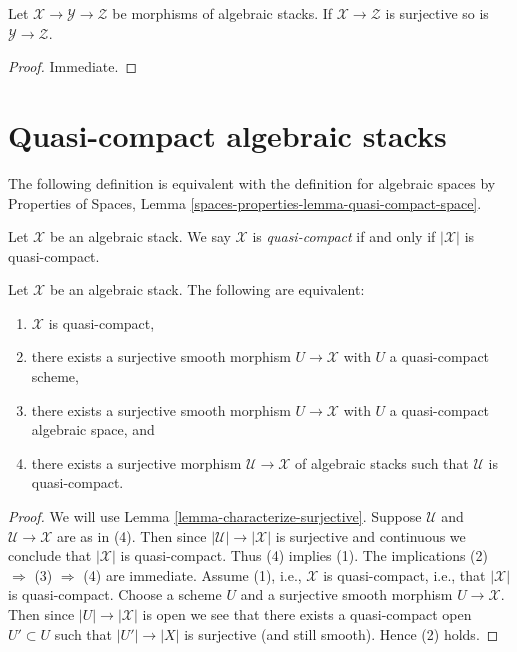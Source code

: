 \begin{lemma}
\label{lemma-surjective-permanence}
Let $\mathcal{X} \to \mathcal{Y} \to \mathcal{Z}$ be morphisms of
algebraic stacks. If $\mathcal{X} \to \mathcal{Z}$ is surjective
so is $\mathcal{Y} \to \mathcal{Z}$.
\end{lemma}

\begin{proof}
Immediate.
\end{proof}












\section{Quasi-compact algebraic stacks}
\label{section-quasi-compact}

\noindent
The following definition is equivalent with the definition for algebraic
spaces by
Properties of Spaces, Lemma \ref{spaces-properties-lemma-quasi-compact-space}.

\begin{definition}
\label{definition-quasi-compact}
Let $\mathcal{X}$ be an algebraic stack.
We say $\mathcal{X}$ is {\it quasi-compact}
if and only if $|\mathcal{X}|$ is quasi-compact.
\end{definition}

\begin{lemma}
\label{lemma-quasi-compact-stack}
Let $\mathcal{X}$ be an algebraic stack.
The following are equivalent:
\begin{enumerate}
\item $\mathcal{X}$ is quasi-compact,
\item there exists a surjective smooth morphism $U \to \mathcal{X}$
with $U$ a quasi-compact scheme,
\item there exists a surjective smooth morphism $U \to \mathcal{X}$
with $U$ a quasi-compact algebraic space, and
\item there exists a surjective morphism $\mathcal{U} \to \mathcal{X}$
of algebraic stacks such that $\mathcal{U}$ is quasi-compact.
\end{enumerate}
\end{lemma}

\begin{proof}
We will use
Lemma \ref{lemma-characterize-surjective}.
Suppose $\mathcal{U}$ and $\mathcal{U} \to \mathcal{X}$ are as in (4).
Then since $|\mathcal{U}| \to |\mathcal{X}|$ is surjective and
continuous we conclude that $|\mathcal{X}|$ is quasi-compact.
Thus (4) implies (1). The implications (2) $\Rightarrow$ (3) $\Rightarrow$ (4)
are immediate. Assume (1), i.e., $\mathcal{X}$ is quasi-compact, i.e., that
$|\mathcal{X}|$ is quasi-compact. Choose a scheme $U$ and a surjective
smooth morphism $U \to \mathcal{X}$. Then since $|U| \to |\mathcal{X}|$
is open we see that there exists a quasi-compact open $U' \subset U$
such that $|U'| \to |X|$ is surjective (and still smooth).
Hence (2) holds.
\end{proof}


